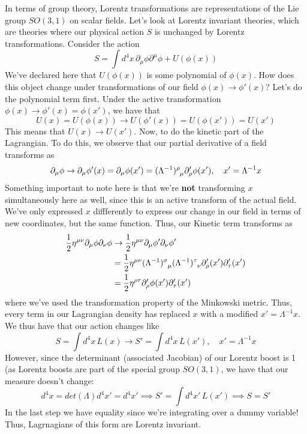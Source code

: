 \documentclass[11pt, oneside]{article}   	%
\theoremstyle{newline}
\theoremstyle{newline}
\theoremstyle{newline}
\theoremstyle{newline}
\theoremstyle{newline}
\begin{document}
In terms of group theory, Lorentz transformations are representations of the Lie group $SO( 3, 1)$ on scalar fields. Let's look at Lorentz invariant theories, which are theories where our physical action $S$ is unchanged by Lorentz transformations. Consider the action 
\[ 
S = \int d^4 x \, \partial_\mu \phi \partial^\mu \phi + U ( \phi(x) ) 
\]
We've declared here that $U ( \phi (x) )$ is some polynomial of $\phi(x)$.  
How does this object change under transformations of our field $\phi( x)  \rightarrow \phi ' ( x) $? Let's do the polynomial term first. Under the active transformation $ \phi(x) \rightarrow \phi' (x) = \phi ( x' )$, we have that 
\[ 
U ( x)  = U ( \phi (x) ) \rightarrow U ( \phi' (x) ) = U ( \phi (x') ) = U ( x') 
\]
This means that $U (x) \rightarrow U ( x')$. Now, to do the kinetic part of the Lagrangian.  
To do this, we observe that our partial derivative of a field transforms as 
\[ 
\partial_\mu \phi \rightarrow \partial_\mu \phi'( x ) = \partial_\mu \phi(x' )  = (\Lambda^{-1} )\indices{^\rho_\mu} \partial'_\rho \phi(x'), \quad x'  =\Lambda^{ -1} x 
\] 
Something important to note here is that we're \textbf{ not} transforming $x$ simultaneously here as well, since this is an active transform of the actual field. We've only expressed $x$ diffferently to express our change in our field in terms of new coordinates, but the same function. 
Thus, our Kinetic term transforms as 
\begin{align*}
\frac{1}{2} \eta^{ \mu \nu} \partial_\mu \phi \partial_\nu \phi & \rightarrow \frac{1}{2} \eta^{ \mu \nu} \partial_\mu \phi' \partial_\nu \phi' \\
&= \frac{1}{2} \eta^{ \mu \nu} ( \Lambda^{ -1})\indices{^\sigma_\mu} ( \Lambda^{ -1} ) \indices{^\tau_\nu} \partial'_\rho ( x' ) \partial'_\tau ( x' ) \\
& = \frac{1}{ 2} \eta^{ \rho \tau} \partial_\rho' \phi(x') \partial_\tau'(x') 
\end{align*} 
where we've used the transformation property of the Minkowski metric. Thus, every term in our Lagrangian density has replaced $x$ with a modified $ x '  = \Lambda^{ -1} x $. We thus have that our action changes like 
\[ 
S = \int d^4 x \, L (x) \rightarrow  S'  = \int d^4 x \, L ( x' ), \quad x' = \Lambda^{ -1}  x 
\] 
However, since the determinant (associated Jacobian) of our Lorentz boost is 1 (as Lorentz boosts are part of the special group $SO(3,1)$, we have that our measure doesn't change: 
\[ 
d^4 x  = det ( \Lambda ) d^4 x'  = d^4 x' \implies S' = \int d^4 x' \, L ( x' )  \implies S = S'
\] 
In the last step we have equality since we're integrating over a dummy variable! Thus, Lagrnagians of this form are Lorentz invariant. 
\end{document}
